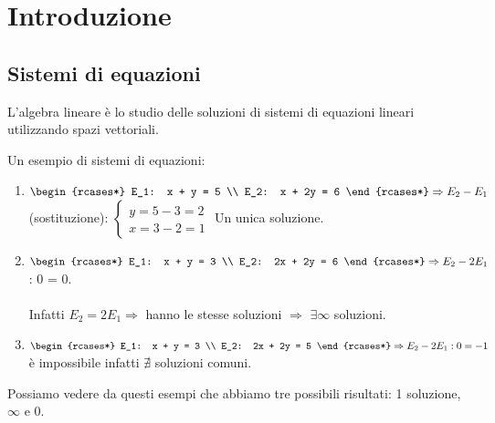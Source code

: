 \section{Introduzione}
\subsection{Sistemi di equazioni}
L'algebra lineare è lo studio delle soluzioni di sistemi di equazioni lineari utilizzando spazi vettoriali.
\begin{example}
Un esempio di sistemi di equazioni:
\begin{enumerate}
    \item
    $\begin{rcases*}
    	E_1: x + y = 5 \\ E_2: x + 2y = 6
    \end{rcases*}
	\Rightarrow E_2 - E_1$ (sostituzione):
	$\begin{cases}
		y = 5 - 3 = 2 \\ x = 3 - 2 = 1
	\end{cases}$ 
	Un unica soluzione.
    \item 
    $\begin{rcases*}
    	E_1: x + y = 3 \\ E_2: 2x + 2y = 6
    \end{rcases*}
	\Rightarrow E_2 - 2E_1$: 0 = 0.\\\\
    Infatti $E_2 = 2E_1 \Rightarrow$ hanno le stesse soluzioni $\Rightarrow$ $\exists \infty$ soluzioni.
    \item 
    $\begin{rcases*}
    	E_1: x + y = 3 \\ E_2: 2x + 2y = 5
    \end{rcases*}
	\Rightarrow E_2 - 2E_1: 0 = -1$ è impossibile infatti $\nexists$ soluzioni comuni.
\end{enumerate}
Possiamo vedere da questi esempi che abbiamo tre possibili risultati: 1 soluzione, $\infty$ e 0.
\end{example}


